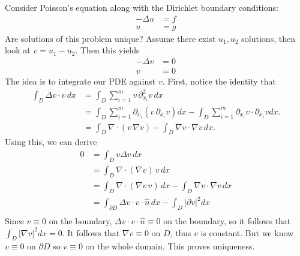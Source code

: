 \begin{example}
	Consider Poisson's equation along with the Dirichlet boundary conditions:
	\begin{align*}
		\tag{\( x \in D \)} - \Delta u &= f \\
		\tag{\( x \in \partial D \)}u &= g
	\end{align*}
	Are solutions of this problem unique? Assume there exist \( u_{1}, u_{2} \) solutions, then look at \( v = u_{1} - u_{2} \).
	Then this yields
	\begin{align*}
		\tag{\( x \in D \)}- \Delta v &= 0 \\
		\tag{\( x \in \partial D \)}v &= 0
	\end{align*}
	The idea is to integrate our PDE against \( v \). First, notice the identity that 
	\begin{align*}
		\int_{D}  \Delta v \cdot v \, dx &= \int_{D}  \sum_{i=1}^{m} v \, \partial_{x_{i}}^{2} v \, dx \\
																	&= \int_{D}  \sum_{i=1}^{m} \partial_{x_{i}} \left( v\, \partial_{x_{i}} v \right) dx - \int_{D} \sum_{i=1}^{m} \partial_{x_{i}} v \cdot \partial_{x_{i}} v dx. \\
																	&= \int_{D}  \nabla \cdot (v \, \nabla v)  - \int_{D} \nabla v \cdot \nabla v \, dx.
	\end{align*}
	Using this, we can derive
	\begin{align*}
		0 &= \int_{D} v \Delta v \, dx \\
			&= \int_{D} \nabla \cdot (\nabla v) \,  v\, dx \\
		\tag{1}&= \int_{D} \nabla \cdot (\nabla v \, v) \, dx - \int_{D}  \nabla v \cdot \nabla v \, dx \\
			&= \int_{\partial D}  \Delta v \cdot v \cdot \hat n \, dx - \int_{D} |\partial v|^{2} dx \\
	\end{align*}
	Since \( v \equiv 0 \) on the boundary, \( \Delta v \cdot v \cdot \hat n \equiv 0 \) on the boundary, so it follows that \( \int_{D} | \nabla v|^{2} dx = 0 \). It follows that \( \nabla v \equiv 0 \) on \( D \), thus \( v \) is constant. But we know \( v \equiv 0 \) on \( \partial D \) so \( v \equiv 0 \) on the whole domain. This proves uniqueness.
\end{example}

